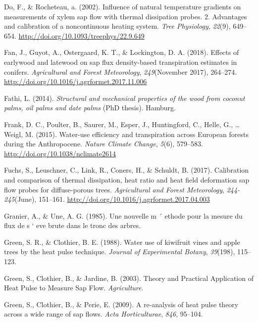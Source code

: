 \documentclass[11pt,twoside]{reedthesis}
\begin{document}
\hypertarget{ref-Do2002}{}
Do, F., \& Rocheteau, a. (2002). Influence of natural temperature
gradients on measurements of xylem sap flow with thermal dissipation
probes. 2. Advantages and calibration of a noncontinuous heating system.
\emph{Tree Physiology}, \emph{22}(9), 649--654.
\url{http://doi.org/10.1093/treephys/22.9.649}

\hypertarget{ref-Fan2018}{}
Fan, J., Guyot, A., Ostergaard, K. T., \& Lockington, D. A. (2018).
Effects of earlywood and latewood on sap flux density-based
transpiration estimates in conifers. \emph{Agricultural and Forest
Meteorology}, \emph{249}(November 2017), 264--274.
\url{http://doi.org/10.1016/j.agrformet.2017.11.006}

\hypertarget{ref-Fathi2014}{}
Fathi, L. (2014). \emph{Structural and mechanical properties of the wood
from coconut palms, oil palms and date palms} (PhD thesis). Hamburg.

\hypertarget{ref-Frank2015}{}
Frank, D. C., Poulter, B., Saurer, M., Esper, J., Huntingford, C.,
Helle, G., \ldots{} Weigl, M. (2015). Water-use efficiency and
transpiration across European forests during the Anthropocene.
\emph{Nature Climate Change}, \emph{5}(6), 579--583.
\url{http://doi.org/10.1038/nclimate2614}

\hypertarget{ref-Fuchs2017}{}
Fuchs, S., Leuschner, C., Link, R., Coners, H., \& Schuldt, B. (2017).
Calibration and comparison of thermal dissipation, heat ratio and heat
field deformation sap flow probes for diffuse-porous trees.
\emph{Agricultural and Forest Meteorology}, \emph{244-245}(June),
151--161. \url{http://doi.org/10.1016/j.agrformet.2017.04.003}

\hypertarget{ref-Granier1985}{}
Granier, A., \& Une, A. G. (1985). Une nouvelle m ´ ethode pour la
mesure du flux de s ` eve brute dans le tronc des arbres.

\hypertarget{ref-Green1988}{}
Green, S. R., \& Clothier, B. E. (1988). Water use of kiwifruit vines
and apple trees by the heat pulse technique. \emph{Journal of
Experimental Botany}, \emph{39}(198), 115--123.

\hypertarget{ref-Green2003}{}
Green, S., Clothier, B., \& Jardine, B. (2003). Theory and Practical
Application of Heat Pulse to Measure Sap Flow. \emph{Agriculture}.

\hypertarget{ref-Green2009}{}
Green, S., Clothier, B., \& Perie, E. (2009). A re-analysis of heat
pulse theory across a wide range of sap flows. \emph{Acta
Horticulturae}, \emph{846}, 95--104.
\end{document}
